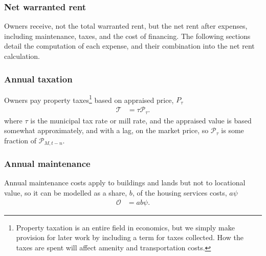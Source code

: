 \subsubsection{Net warranted rent} \label{section-net-rent}
Owners receive, not the total warranted rent, but the \gls{net rent} after expenses, including maintenance, taxes, and the cost of financing. The following sections detail the computation of each expense, and their combination into the net rent calculation.

\subsubsection{Annual taxation}
Owners pay property taxes\footnote{Property taxation is an entire field in economics, but we simply make provision for later work by including a term for taxes collected. How the taxes are spent will affect amenity and transportation costs.} based on appraised price, $P_{\tau}$
\begin{align*}
\mathcal{T} &= \tau  \mathcal{P}_{\tau}.
\end{align*}
where $\tau$ is the municipal tax rate or \gls{mill rate}, and the \gls{appraised value} is based somewhat approximately, and with a lag, on the \gls{market price}, so $\mathcal{P}_{\tau}$ is some fraction of $\mathcal{P}_{M, t-n}$.



\subsubsection{Annual maintenance}
Annual maintenance costs apply to buildings and lands but not to locational value, so it can be modelled as a share, $b$, of the housing services costs, $a \psi$ 
\begin{align}
\mathcal{O} &= a b \psi.
\end{align}

